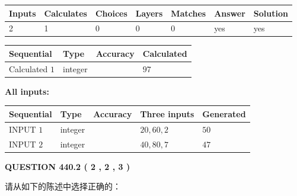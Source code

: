 \documentclass{ctexart}
\begin{document}
 
\noindent{}
 
 

 
   
   
   
   
\noindent\begin{tabular}{|l|l|l|l|l|l|l|}
 \hline
Inputs & Calculates & Choices & Layers & Matches & Answer & Solution \\ \hline
 2  & 
 1  & 
 0
  & 
 0  & 
 0  & 
  yes & 
  yes 
  \\ \hline
 \end{tabular}
   
   
   
   
\noindent{}
   
   
  
  
\noindent\begin{tabular}{|l|l|l|l|}
\hline
 Sequential & Type & Accuracy & Calculated \\ 
\hline
 
 
  Calculated $  1 $ & integer &  & 
  $ 97 $ 
 \\  \hline  
 \end{tabular}
   
   
   
   
\noindent\vspace{0.1in}\hspace{-0.08in} {\textbf{\Large{All inputs: }}}
   
   
  
  
\noindent\begin{tabular}{|l|l|l|l|l|}
\hline
 Sequential & Type & Accuracy & Three inputs & Generated \\ 
\hline
 
 
  INPUT $  1 $ & integer &  & $
 20
 , 
 60
 , 
 2
 $ & $ 50 $ 
 \\  \hline  
 
 
  INPUT $  2 $ & integer &  & $
 40
 , 
 80
 , 
 7
 $ & $ 47 $ 
 \\  \hline  
 \end{tabular}
   
   
  
\vspace{0.2in}
  
{\textbf{\Large{QUESTION
440.2 
 ( 2 , 2 , 3 )
}}}
  
  
请从如下的陈述中选择正确的：
 
\end{document}

